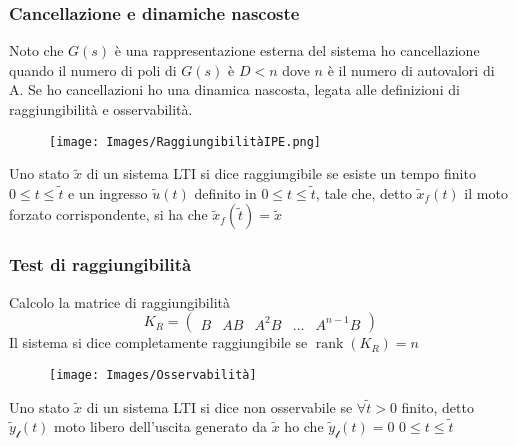 	\subsubsection{Cancellazione e dinamiche nascoste}
	Noto che $ G(s) $ è una rappresentazione esterna del sistema ho cancellazione quando il numero di poli di $ G(s) $ è $ D<n $ dove $ n $ è il numero di autovalori di A. Se ho cancellazioni ho una dinamica nascosta, legata alle definizioni di raggiungibilità e osservabilità.
	\begin{figure}[H]
		\centering
		\texttt{[image: Images/RaggiungibilitàIPE.png]}
	\end{figure}
	Uno stato $\tilde{x}$ di un sistema LTI si dice raggiungibile se esiste un tempo finito $ 0\leq t \leq \tilde{t} $ e un ingresso $ \tilde{u}(t) $ definito in $ 0\leq t \leq \tilde{t} $, tale che, detto $ \tilde{x}_{f}(t) $ il moto forzato corrispondente, si ha che $ \tilde{x}_{f}(\tilde{t}) = \tilde{x}$
	\subsubsection{Test di raggiungibilità}
	Calcolo la matrice di raggiungibilità 
	\[K_R=\left(\begin{array}{lllll}
		B & A B & A^2 B & \ldots & A^{n-1} B
	\end{array}\right)\]
	Il sistema si dice completamente raggiungibile se $ \operatorname{rank}(K_R) = n $
	\begin{figure}[H]
		\centering
		\texttt{[image: Images/Osservabilità]}
	\end{figure}
	Uno stato $ \tilde{x} $ di un sistema LTI si dice non osservabile se $\forall \tilde{t}>0$ finito, detto $ \tilde{y}_\mathcal{l}(t)$ moto libero dell'uscita generato da $\tilde{x}$ ho che $ \tilde{y}_\mathcal{l}(t)=0 $ $ 0\leq t\leq\tilde{t} $

